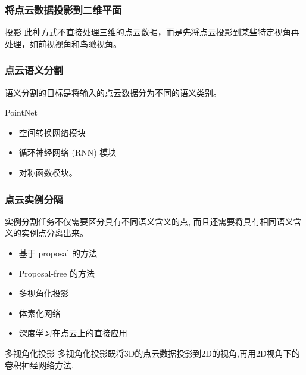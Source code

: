 \documentclass{beamer}
\begin{document}
\begin{frame}
  \frametitle{将点云数据投影到二维平面}
  \begin{block}{投影}
此种方式不直接处理三维的点云数据，而是先将点云投影到某些特定视角再处理，如前视视角和鸟瞰视角。
  \end{block}
\end{frame}


\begin{frame}
  \frametitle{点云语义分割}
  语义分割的目标是将输入的点云数据分为不同的语义类别。

  \begin{block}{  PointNet}
  \begin{itemize}
  \item  空间转换网络模块
  \item  循环神经网络 (RNN) 模块
  \item 对称函数模块。
  \end{itemize}
  \end{block}

\end{frame}

\begin{frame}
  \frametitle{点云实例分隔}

  实例分割任务不仅需要区分具有不同语义含义的点,
  而且还需要将具有相同语义含义的实例点分离出来。
\end{frame}

\begin{frame}

  \begin{itemize}
  \item  基于 proposal 的方法
  \item Proposal-free 的方法
  \end{itemize}
\end{frame}

\begin{frame}
  \begin{itemize}
  \item 多视角化投影
  \item 体素化网络
  \item 深度学习在点云上的直接应用
  \end{itemize}
\end{frame}

\begin{frame}
  \begin{block}{多视角化投影}
    多视角化投影既将3D的点云数据投影到2D的视角,再用2D视角下的卷积神经网络方法.
  \end{block}
\end{frame}
\end{document}
